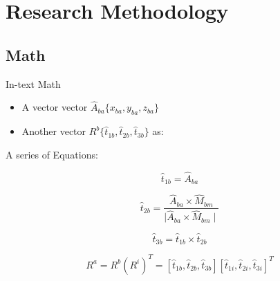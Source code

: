 
\chapter{Research Methodology} %



\ifpdf
    \graphicspath{{4_chapter4/figures/PNG/}{4_chapter4/figures/PDF/}{4_chapter4/figures/}}
\else
    \graphicspath{{4_chapter4/figures/EPS/}{4_chapter4/figures/}}
\fi



\section{Math}


In-text Math
\begin{itemize}
\item A vector vector $\hat{A}_{ba}\{x_{ba}, y_{ba}, z_{ba}\} $  
\item Another vector $R^{b}\{\hat{t}_{1b}, \hat{t}_{2b}, \hat{t}_{3b}\}$ as:
\end{itemize}


\vspace{5mm}
A series of Equations:

\begin{equation}\label{eq:T1b}
\hat{t}_{1b} = \hat{A}_{ba}
\end{equation} 


\begin{equation}\label{eq:T2b}
\hat{t}_{2b} = \frac{\hat{A}_{ba} \times \hat{M}_{bm}}{\mid \hat{A}_{ba} \times \hat{M}_{bm} \mid}
\end{equation}  


\begin{equation}\label{eq:T3b}
\hat{t}_{3b} = \hat{t}_{1b} \times \hat{t}_{2b}
\end{equation}  

 \begin{equation}\label{eq:Ra}
R^{a} = R^{b} (R^{i})^{T} = [\hat{t}_{1b}, \hat{t}_{2b}, \hat{t}_{3b}] [\hat{t}_{1i}, \hat{t}_{2i}, \hat{t}_{3i}]^{T}
\end{equation}  

\vspace{5mm}

